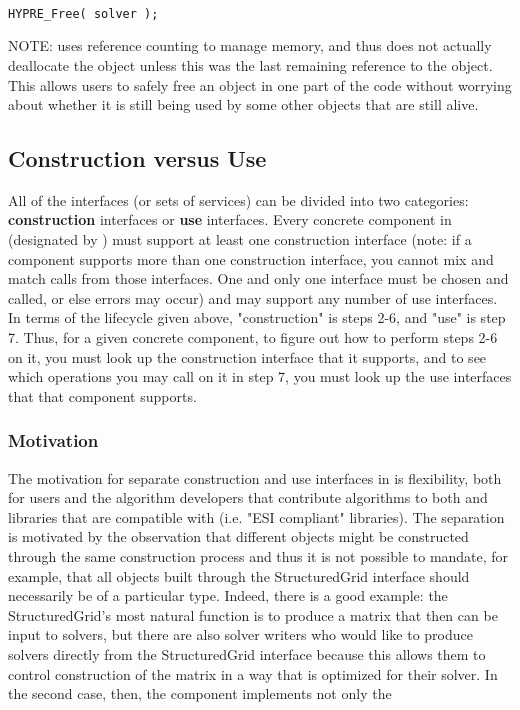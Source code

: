 \begin{enumerate}
\begin{enumerate}
\begin{display}
\begin{verbatim}

HYPRE_Free( solver );

\end{verbatim}
\end{display}

NOTE: \hypre{} uses reference counting to
manage memory, and 
thus  does not actually deallocate the object unless this was the
last remaining reference 
to the object. This allows users to safely free an object in one part of the
code without worrying about 
whether it is still being used by some other objects that are still alive.

\end{enumerate}

\subsection{Construction versus Use}

All of the \hypre{} interfaces (or sets of services) can be divided into two
categories: {\bf construction} 
interfaces or {\bf use} interfaces. Every concrete component in \hypre{} 
(designated by
) must support at 
least one construction interface (note: if a component supports more than one
construction interface, you 
cannot mix and match calls from those interfaces. One and only one interface
must be chosen and called, or 
else errors may occur) and may support any number of use interfaces. In terms
of the lifecycle given above, 
"construction" is steps 2-6, and "use" is step 7. Thus, for a given concrete
component, to figure out how to 
perform steps 2-6 on it, you must look up the \hypre{} construction interface that
it supports, and to see 
which operations you may call on it in step 7, you must look up the use
interfaces that that component 
supports.

\subsubsection{Motivation} The motivation for separate construction and use interfaces in
\hypre{} is flexibility, both for 
users and the algorithm developers that contribute algorithms to both \hypre{} and
libraries that are 
compatible with \hypre{} (i.e. "ESI compliant" libraries). The separation is
motivated by the observation 
that different objects might be constructed through the same construction
process and thus it is not possible 
to mandate, for example, that all objects built through the StructuredGrid
interface should necessarily be of 
a particular type. Indeed, there is a good example: the StructuredGrid's most
natural function is to produce 
a matrix that then can be input to solvers, but there are also solver writers
who would like to produce 
solvers directly from the StructuredGrid interface because this allows them to
control construction of the 
matrix in a way that is optimized for their solver. In the second case, then,
the component implements not only the 
\end{enumerate}
